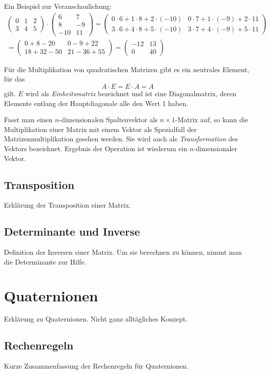 Ein Beispiel zur Veranschaulichung:
\begin{equation}
\begin{split}
 \begin{pmatrix}
  0 & 1 & 2 \\
  3 & 4 & 5
 \end{pmatrix}
 \cdot
 \begin{pmatrix}
  6 & 7 \\
  8 & -9 \\
  -10 & 11
 \end{pmatrix}
 =
 \begin{pmatrix}
  0 \cdot 6 + 1 \cdot 8 + 2 \cdot (-10) & 0 \cdot 7 + 1 \cdot (-9) + 2 \cdot 11 \\
  3 \cdot 6 + 4 \cdot 8 + 5 \cdot (-10) & 3 \cdot 7 + 4 \cdot (-9) + 5 \cdot 11
 \end{pmatrix}\\
 =
 \begin{pmatrix}
  0 + 8 - 20 & 0 - 9 + 22 \\
  18 + 32 - 50 & 21 - 36 + 55
 \end{pmatrix}
 =
 \begin{pmatrix}
   -12 & 13 \\
   0 & 40
 \end{pmatrix}
\end{split}
\end{equation}

Für die Multiplikation von quadratischen Matrizen gibt es ein neutrales Element, für das
\begin{equation}
 A \cdot E = E \cdot A = A
\end{equation}
gilt. $E$ wird als \emph{Einheitsmatrix} bezeichnet und ist eine Diagonalmatrix, deren Elemente entlang der Hauptdiagonale alle den Wert 1 haben.

Fasst man einen $n$-dimensionalen Spaltenvektor als $n \times 1$-Matrix auf, so kann die Multiplikation einer Matrix mit einem Vektor als Spezialfall der Matrizenmultiplikation gesehen werden. Sie wird auch als \emph{Transformation} des Vektors bezeichnet. Ergebnis der Operation ist wiederum ein $n$-dimensionaler Vektor.


\subsection{Transposition}
\label{transposition}
Erklärung der Transposition einer Matrix.

\subsection{Determinante und Inverse}
Definition der Inversen einer Matrix. Um sie berechnen zu können, nimmt man die Determinante zur Hilfe.

\section{Quaternionen}
Erklärung zu Quaternionen. Nicht ganz alltägliches Konzept.

\subsection{Rechenregeln}
Kurze Zusammenfassung der Rechenregeln für Quaternionen.
